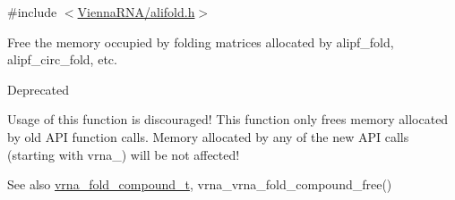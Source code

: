{\ttfamily \#include $<$\mbox{\hyperlink{alifold_8h}{Vienna\+R\+N\+A/alifold.\+h}}$>$}



Free the memory occupied by folding matrices allocated by alipf\+\_\+fold, alipf\+\_\+circ\+\_\+fold, etc. 

\begin{DoxyRefDesc}{Deprecated}
\item[\mbox{\hyperlink{deprecated__deprecated000022}{Deprecated}}]Usage of this function is discouraged! This function only free\textquotesingle{}s memory allocated by old A\+PI function calls. Memory allocated by any of the new A\+PI calls (starting with vrna\+\_\+) will be not affected!\end{DoxyRefDesc}


\begin{DoxySeeAlso}{See also}
\mbox{\hyperlink{group__fold__compound_ga1b0cef17fd40466cef5968eaeeff6166}{vrna\+\_\+fold\+\_\+compound\+\_\+t}}, vrna\+\_\+vrna\+\_\+fold\+\_\+compound\+\_\+free() 
\end{DoxySeeAlso}
